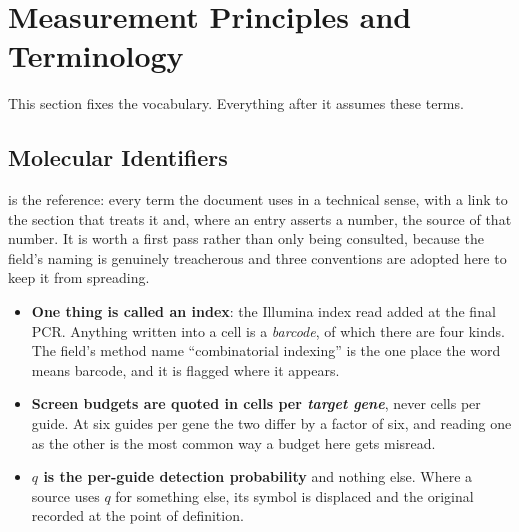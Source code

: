 
\section{Measurement Principles and Terminology}
\label{sec:primer}

This section fixes the vocabulary. Everything after it assumes these terms.

\subsection{Molecular Identifiers}
\label{sec:identifiers}

 is the reference: every term the document uses in a
technical sense, with a link to the section that treats it and, where an entry
asserts a number, the source of that number. It is worth a first pass rather
than only being consulted, because the field's naming is genuinely treacherous
and three conventions are adopted here to keep it from spreading.

\begin{itemize}[leftmargin=1.2em,itemsep=1pt,topsep=2pt]
  \item \textbf{One thing is called an index}: the Illumina index read added at
    the final PCR. Anything written into a cell is a \emph{barcode}, of which
    there are four kinds. The field's method name ``combinatorial indexing''
    is the one place the word means barcode, and it is flagged where it appears.
  \item \textbf{Screen budgets are quoted in cells per \emph{target gene}},
    never cells per guide. At six guides per gene the two differ by a factor of
    six, and reading one as the other is the most common way a budget here gets
    misread.
  \item \textbf{$q$ is the per-guide detection probability} and nothing else.
    Where a source uses $q$ for something else, its symbol is displaced and the
    original recorded at the point of definition.
\end{itemize}

